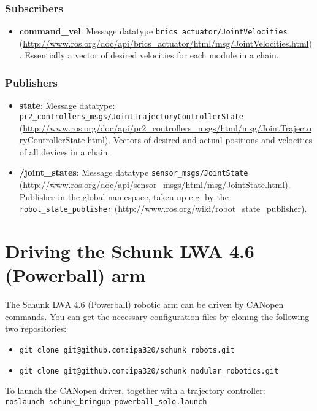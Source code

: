 \subsubsection{Subscribers}

\begin{itemize}
\item {\bf command\_vel}: Message datatype \texttt{brics\_actuator/JointVelocities} (\url{http://www.ros.org/doc/api/brics_actuator/html/msg/JointVelocities.html}). Essentially a vector of desired velocities for each module in a chain.
\end{itemize}

\subsubsection{Publishers}

\begin{itemize}
\item {\bf state}: Message datatype: \texttt{pr2\_controllers\_msgs/JointTrajectoryControllerState} (\url{http://www.ros.org/doc/api/pr2_controllers_msgs/html/msg/JointTrajectoryControllerState.html}). Vectors of desired and actual positions and velocities of all devices in a chain.
\item {\bf /joint\_states}: Message datatype \texttt{sensor\_msgs/JointState} (\url{http://www.ros.org/doc/api/sensor_msgs/html/msg/JointState.html}). Publisher in the global namespace, taken up e.g. by the \texttt{robot\_state\_publisher} (\url{http://www.ros.org/wiki/robot_state_publisher}).
\end{itemize}

\section{Driving the Schunk LWA 4.6 (Powerball) arm}

The Schunk LWA 4.6 (Powerball) robotic arm can be driven by CANopen commands. You can get the necessary configuration files by cloning the following two repositories:
\begin{itemize}
\item \texttt{git clone git@github.com:ipa320/schunk\_robots.git}
\item \texttt{git clone git@github.com:ipa320/schunk\_modular\_robotics.git}
\end{itemize}

To launch the CANopen driver, together with a trajectory controller:\\
\texttt{roslaunch schunk\_bringup powerball\_solo.launch}


